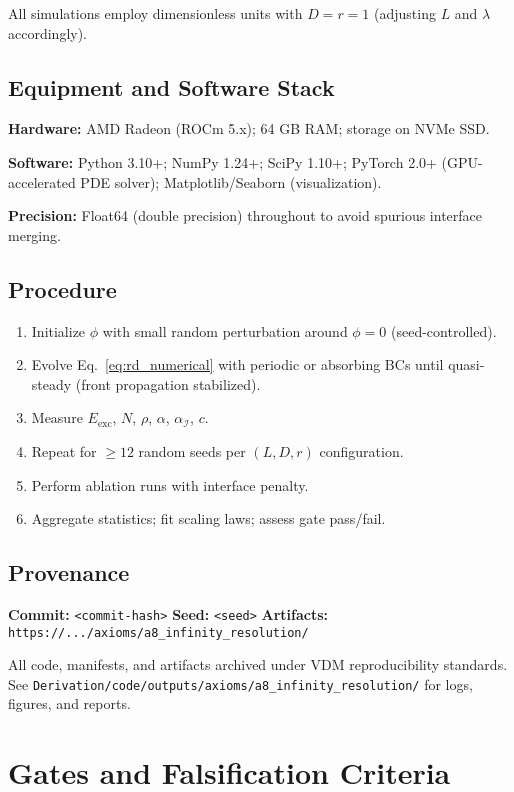 \documentclass{article}
\newcommand{\provenance}[3]{\textbf{Commit:} \texttt{#1}\quad
  \textbf{Seed:} \texttt{#2}\quad
  \textbf{Artifacts:} \texttt{#3}}
\begin{document}
All simulations employ dimensionless units with $D=r=1$ (adjusting $L$ and $\lambda$ accordingly).

\subsection{Equipment and Software Stack}

\textbf{Hardware:} AMD Radeon (ROCm 5.x); 64 GB RAM; storage on NVMe SSD.

\textbf{Software:} Python 3.10+; NumPy 1.24+; SciPy 1.10+; PyTorch 2.0+ (GPU-accelerated PDE solver); Matplotlib/Seaborn (visualization).

\textbf{Precision:} Float64 (double precision) throughout to avoid spurious interface merging.

\subsection{Procedure}

\begin{enumerate}
    \item Initialize $\phi$ with small random perturbation around $\phi=0$ (seed-controlled).
    \item Evolve Eq.~\eqref{eq:rd_numerical} with periodic or absorbing BCs until quasi-steady (front propagation stabilized).
    \item Measure $E_{\text{exc}}$, $N$, $\rho$, $\alpha$, $\alpha_\mathcal{I}$, $c$.
    \item Repeat for $\ge 12$ random seeds per $(L,D,r)$ configuration.
    \item Perform ablation runs with interface penalty.
    \item Aggregate statistics; fit scaling laws; assess gate pass/fail.
\end{enumerate}

\subsection{Provenance}

\provenance{\texttt{<commit-hash>}}{\texttt{<seed>}}{\texttt{https://.../axioms/a8\_infinity\_resolution/}}

All code, manifests, and artifacts archived under VDM reproducibility standards. See \texttt{Derivation/code/outputs/axioms/a8\_infinity\_resolution/} for logs, figures, and reports.

\section{Gates and Falsification Criteria}
\label{sec:gates}
\end{document}
